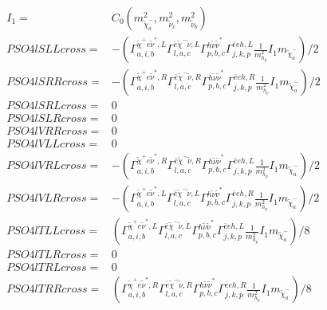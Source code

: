 \documentclass[A4,landscape]{article}
\begin{document}
\begin{align} 
I_1= & C_0(m^2_{\tilde{\chi}^-_{{a}}}, m^2_{\tilde{\nu}_{{c}}}, m^2_{\tilde{\nu}_{{b}}}) \\ 
  PSO4lSLLcross= & -( \Gamma^{\tilde{\chi}^+e \tilde{\nu}^*,L}_{a, i, b} \Gamma^{\bar{e}\tilde{\chi}^- \tilde{\nu} ,L}_{l, a, c} \Gamma^{h \tilde{\nu} \tilde{\nu}^*}_{p, b, c} \Gamma^{\bar{e}e h ,L}_{j, k, p} \frac{1}{m^2_{h_{{p}}}} I_1 m_{\tilde{\chi}^-_{{a}}})/2 \\ 
  PSO4lSRRcross= & -( \Gamma^{\tilde{\chi}^+e \tilde{\nu}^*,R}_{a, i, b} \Gamma^{\bar{e}\tilde{\chi}^- \tilde{\nu} ,R}_{l, a, c} \Gamma^{h \tilde{\nu} \tilde{\nu}^*}_{p, b, c} \Gamma^{\bar{e}e h ,R}_{j, k, p} \frac{1}{m^2_{h_{{p}}}} I_1 m_{\tilde{\chi}^-_{{a}}})/2 \\ 
  PSO4lSRLcross= & 0 \\ 
  PSO4lSLRcross= & 0 \\ 
  PSO4lVRRcross= & 0 \\ 
  PSO4lVLLcross= & 0 \\ 
  PSO4lVRLcross= & -( \Gamma^{\tilde{\chi}^+e \tilde{\nu}^*,R}_{a, i, b} \Gamma^{\bar{e}\tilde{\chi}^- \tilde{\nu} ,R}_{l, a, c} \Gamma^{h \tilde{\nu} \tilde{\nu}^*}_{p, b, c} \Gamma^{\bar{e}e h ,L}_{j, k, p} \frac{1}{m^2_{h_{{p}}}} I_1 m_{\tilde{\chi}^-_{{a}}})/2 \\ 
  PSO4lVLRcross= & -( \Gamma^{\tilde{\chi}^+e \tilde{\nu}^*,L}_{a, i, b} \Gamma^{\bar{e}\tilde{\chi}^- \tilde{\nu} ,L}_{l, a, c} \Gamma^{h \tilde{\nu} \tilde{\nu}^*}_{p, b, c} \Gamma^{\bar{e}e h ,R}_{j, k, p} \frac{1}{m^2_{h_{{p}}}} I_1 m_{\tilde{\chi}^-_{{a}}})/2 \\ 
  PSO4lTLLcross= & ( \Gamma^{\tilde{\chi}^+e \tilde{\nu}^*,L}_{a, i, b} \Gamma^{\bar{e}\tilde{\chi}^- \tilde{\nu} ,L}_{l, a, c} \Gamma^{h \tilde{\nu} \tilde{\nu}^*}_{p, b, c} \Gamma^{\bar{e}e h ,L}_{j, k, p} \frac{1}{m^2_{h_{{p}}}} I_1 m_{\tilde{\chi}^-_{{a}}})/8 \\ 
  PSO4lTLRcross= & 0 \\ 
  PSO4lTRLcross= & 0 \\ 
  PSO4lTRRcross= & ( \Gamma^{\tilde{\chi}^+e \tilde{\nu}^*,R}_{a, i, b} \Gamma^{\bar{e}\tilde{\chi}^- \tilde{\nu} ,R}_{l, a, c} \Gamma^{h \tilde{\nu} \tilde{\nu}^*}_{p, b, c} \Gamma^{\bar{e}e h ,R}_{j, k, p} \frac{1}{m^2_{h_{{p}}}} I_1 m_{\tilde{\chi}^-_{{a}}})/8 \\ 
\end{align} 
\end{document}
